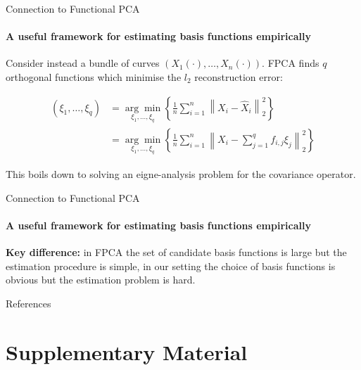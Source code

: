 \documentclass{beamer}
\begin{document}

\begin{frame}{Connection to Functional PCA}
\framesubtitle{A useful framework for estimating basis functions empirically}    
    
Consider instead a bundle of curves $\left ( X_1(\cdot), \dots , X_n(\cdot) \right )$. FPCA finds $q$ orthogonal functions which minimise the $l_2$ reconstruction error: 

\begin{align*}
	\left ( \xi_1, \dots, \xi_q \right ) & = \underset{\xi_1, \dots, \xi_q}{\arg\min} \left \{ \frac{1}{n} \sum_{i=1}^n \left \| X_i - \widehat{X}_i \right \|_2^2 \right \} \\ 
	& = \underset{\xi_1, \dots, \xi_q}{\arg\min} \left \{ \frac{1}{n} \sum_{i=1}^n \left \| X_i - \sum_{j=1}^q f_{i,j} \xi_j \right \|_2^2 \right \}
\end{align*}

\bigskip

This boils down to solving an eigne-analysis problem for the covariance operator. 
    
\end{frame}




\begin{frame}{Connection to Functional PCA}
\framesubtitle{A useful framework for estimating basis functions empirically}

\centering 
\textbf{Key difference:} in FPCA the set of candidate basis functions is large but the estimation procedure is simple, in our setting the choice of basis functions is obvious but the estimation problem is hard. 

\end{frame}




\begin{frame}[allowframebreaks]{References}


\end{frame}




\section{Supplementary Material}
 
\end{document}
